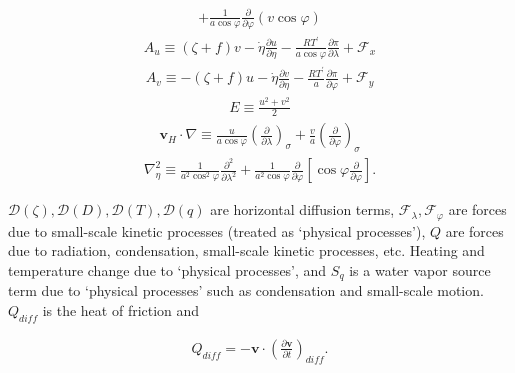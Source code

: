 \begin{eqnarray}
             +    \frac{1}{a \cos\varphi }
                    \frac{\partial }{\partial \varphi}
                    ( v \cos\varphi )
\end{eqnarray} \begin{eqnarray}
    A_u  \equiv   ( \zeta + f ) v
             - \dot{\eta} \frac{\partial u}{\partial \eta} 
             - \frac{RT^{\prime}}{a\cos\varphi} 
                  \frac{\partial \pi}{\partial \lambda} 
             + {\mathcal F}_x
\end{eqnarray} \begin{eqnarray}
    A_v  \equiv  - ( \zeta + f ) u
             - \dot{\eta} \frac{\partial v}{\partial \eta} 
             - \frac{RT^{\prime}}{a}
                  \frac{\partial \pi}{\partial \varphi} 
             + {\mathcal F}_y
\end{eqnarray} \begin{eqnarray}
     E  \equiv   \frac{u^{2}+v^{2}}{2}
\end{eqnarray} \begin{eqnarray}
 {\mathbf{v}}_{H} \cdot \nabla
        \equiv  \frac{u}{a \cos \varphi} 
         \left( \frac{\partial }{\partial \lambda} \right)_{\sigma}
     + \frac{v}{a}
         \left( \frac{\partial }{\partial \varphi} \right)_{\sigma} 
\end{eqnarray} \begin{eqnarray}
  \nabla^{2}_{\eta}  
        \equiv  
               \frac{1}{a^{2}\cos^2\varphi} 
                 \frac{\partial^{2} }{\partial \lambda^{2}} 
             + \frac{1}{a^{2}\cos\varphi} 
                 \frac{\partial }{\partial \varphi}
                 \left[ \cos\varphi
                       \frac{\partial }{\partial \varphi} \right]  .
\end{eqnarray}

\({\mathcal D}(\zeta), {\mathcal D}(D), {\mathcal D}(T), {\mathcal D}(q)\)
are horizontal diffusion terms,
\({\mathcal F}_\lambda, {\mathcal F}_\varphi\) are forces due to
small-scale kinetic processes (treated as `physical processes'), \(Q\)
are forces due to radiation, condensation, small-scale kinetic
processes, etc. Heating and temperature change due to `physical
processes', and \(S_q\) is a water vapor source term due to `physical
processes' such as condensation and small-scale motion. \(Q_{diff}\) is
the heat of friction and

\begin{eqnarray}
  Q_{diff}
 = - {\mathbf{v}} \cdot  ( \frac{\partial {\mathbf{v}}}{\partial t} )_{diff} .
\end{eqnarray}

